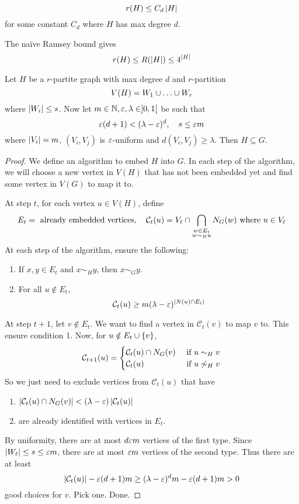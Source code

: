 \documentclass{article}
\begin{document}
\begin{thm}
  $$r(H) \le C_d \left\lvert H\right\rvert$$
  for some constant $C_d$ where $H$ has max degree $d$.
\end{thm}
\begin{rmk}
  The naïve Ramsey bound gives
  $$r(H) \le R(\left\lvert H\right\rvert) \le 4^{\left\lvert H\right\rvert}$$
\end{rmk}

\begin{lem}
  Let $H$ be a $r$-partite graph with max degree $d$ and $r$-partition
  $$V(H) = W_1 \union \dots \union W_r$$
  where $\left\lvert W_i\right\rvert \le s$. Now let $m \in \mathbb N, \varepsilon, \lambda \in ]0, 1[$ be such that
  $$\varepsilon(d + 1) < (\lambda - \varepsilon)^d, \quad s \le \varepsilon m$$
  where $\left\lvert V_i\right\rvert = m$, $(V_i, V_j)$ is $\varepsilon$-uniform and $d(V_i, V_j) \ge \lambda$. Then $H \subseteq G$.
\end{lem}
\begin{proof}
  We define an algorithm to embed $H$ into $G$. In each step of the algorithm, we will choose a new vertex in $V(H)$ that has not been embedded yet and find some vertex in $V(G)$ to map it to.

  At step $t$, for each vertex $u \in V(H)$, define
  $$E_t = \text{ already embedded vertices}, \quad \mathcal C_t(u) = V_\ell \cap \bigcap_{\substack{w \in E_t \\ w \sim_H u}} N_G(w) \text{ where } u \in V_\ell$$
  At each step of the algorithm, ensure the following:
  \begin{enumerate}
    \item If $x, y \in E_t$ and $x \sim_H y$, then $x \sim_G y$.
    \item For all $u \nin E_t$,
    $$\mathcal C_t(u) \ge m(\lambda - \varepsilon)^{\left\lvert N(u) \cap E_t\right\rvert}$$
  \end{enumerate}
  At step $t + 1$, let $v \nin E_t$. We want to find a vertex in $\mathcal C_t(v)$ to map $v$ to. This ensure condition 1. Now, for $u \notin E_t \cup \{v\}$,
  $$\mathcal C_{t + 1}(u) = \begin{cases}
    \mathcal C_t(u) \cap N_G(v) & \text{ if } u \sim_H v \\
    \mathcal C_t(u) & \text{ if } u \not\sim_H v
  \end{cases}$$
  So we just need to exclude vertices from $\mathcal C_t(u)$ that have
  \begin{enumerate}
    \item $\left\lvert \mathcal C_t(u) \cap N_G(v)\right\rvert < (\lambda - \varepsilon)\left\lvert \mathcal C_t(u)\right\rvert$
    \item are already identified with vertices in $E_t$.
  \end{enumerate}
  By uniformity, there are at most $d\varepsilon m$ vertices of the first type. Since $\left\lvert W_\ell\right\rvert \le s \le \varepsilon m$, there are at most $\varepsilon m$ vertices of the second type. Thus there are at least
  $$\left\lvert \mathcal C_t(u)\right\rvert - \varepsilon(d + 1)m \ge (\lambda - \varepsilon)^d m - \varepsilon(d + 1)m > 0$$
  good choices for $v$. Pick one. Done.
\end{proof}
\end{document}
